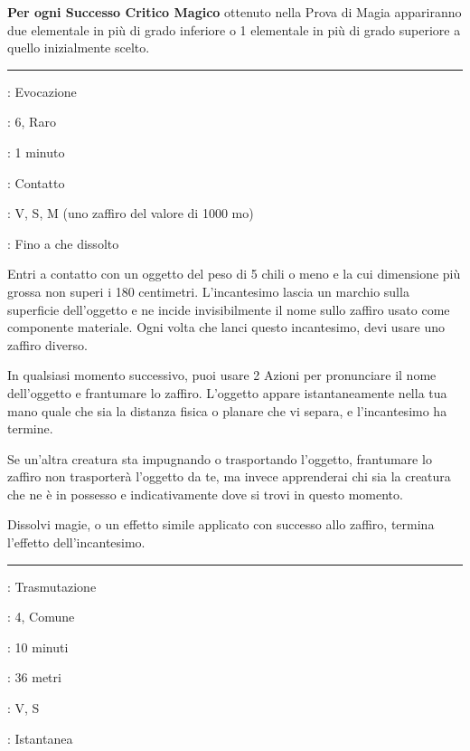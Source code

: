 \begin{multicols}{2}
\textbf{Per ogni Successo Critico Magico} ottenuto nella Prova di Magia appariranno due elementale in più di grado inferiore o 1 elementale in più di grado superiore a quello inizialmente scelto.

\smallskip\noindent\rule{\linewidth}{2pt} \hypertarget{Evocazioni Istantanee}{}\smallskip{}
\noindent
\begin{description}[noitemsep, topsep=0pt, parsep=0pt, partopsep=0pt, leftmargin=0cm, labelwidth=2.8cm]
	\item[\textbf{Lista di Magia}]: Evocazione
	\item[\textbf{Livello}]: 6, Raro
	\item[\textbf{T. di Lancio}]: 1 minuto
	\item[\textbf{Gittata}]: Contatto
	\item[\textbf{Componenti}]: V, S, M (uno zaffiro del valore di 1000 mo)
	\item[\textbf{Durata}]: Fino a che dissolto
\end{description}

Entri a contatto con un oggetto del peso di 5 chili o meno e la cui dimensione più grossa non superi i 180 centimetri. L'incantesimo lascia un marchio sulla superficie dell'oggetto e ne incide invisibilmente il nome sullo zaffiro usato come componente materiale. Ogni volta che lanci questo incantesimo, devi usare uno zaffiro diverso.

In qualsiasi momento successivo, puoi usare 2 Azioni per pronunciare il nome dell'oggetto e frantumare lo zaffiro. L'oggetto appare istantaneamente nella tua mano quale che sia la distanza fisica o planare che vi separa, e l'incantesimo ha termine.

Se un'altra creatura sta impugnando o trasportando l'oggetto, frantumare lo zaffiro non trasporterà l'oggetto da te, ma invece apprenderai chi sia la creatura che ne è in possesso e indicativamente dove si trovi in questo momento.

Dissolvi magie, o un effetto simile applicato con successo allo zaffiro, termina l'effetto dell'incantesimo.

\smallskip\noindent\rule{\linewidth}{2pt} \hypertarget{Fabbricare}{}\smallskip{}
\noindent
\begin{description}[noitemsep, topsep=0pt, parsep=0pt, partopsep=0pt, leftmargin=0cm, labelwidth=2.8cm]
	\item[\textbf{Lista di Magia}]: Trasmutazione
	\item[\textbf{Livello}]: 4, Comune
	\item[\textbf{T. di Lancio}]: 10 minuti
	\item[\textbf{Gittata}]: 36 metri
	\item[\textbf{Componenti}]: V, S
	\item[\textbf{Durata}]: Istantanea
\end{description}


\end{multicols}
